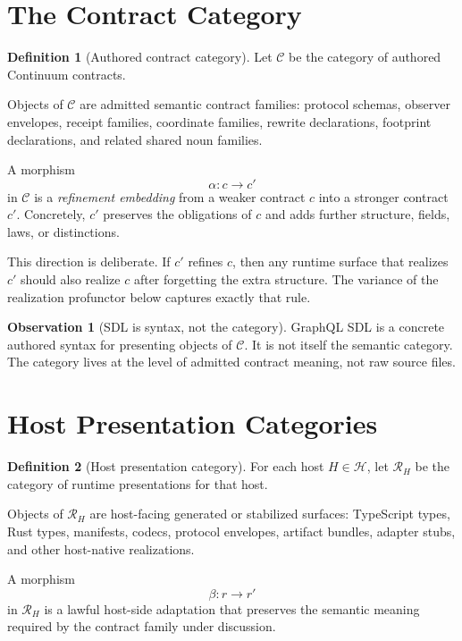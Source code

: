 \documentclass[11pt]{article}
\newcommand{\Ctr}{\mathcal{C}}
\newcommand{\Host}{\mathcal{H}}
\newcommand{\RHost}[1]{\mathcal{R}_{#1}}
\theoremstyle{definition}
\newtheorem{definition}{Definition}
\newtheorem{observation}{Observation}
\begin{document}
\section{The Contract Category}

\begin{definition}[Authored contract category]
Let $\Ctr$ be the category of authored Continuum contracts.

Objects of $\Ctr$ are admitted semantic contract families: protocol schemas,
observer envelopes, receipt families, coordinate families, rewrite
declarations, footprint declarations, and related shared noun families.

A morphism
\[
\alpha : c \to c'
\]
in $\Ctr$ is a \emph{refinement embedding} from a weaker contract $c$ into a
stronger contract $c'$. Concretely, $c'$ preserves the obligations of $c$ and
adds further structure, fields, laws, or distinctions.
\end{definition}

This direction is deliberate. If $c'$ refines $c$, then any runtime surface
that realizes $c'$ should also realize $c$ after forgetting the extra
structure. The variance of the realization profunctor below captures exactly
that rule.

\begin{observation}[SDL is syntax, not the category]
GraphQL SDL is a concrete authored syntax for presenting objects of $\Ctr$.
It is not itself the semantic category. The category lives at the level of
admitted contract meaning, not raw source files.
\end{observation}

\section{Host Presentation Categories}

\begin{definition}[Host presentation category]
For each host $H \in \Host$, let $\RHost{H}$ be the category of runtime
presentations for that host.

Objects of $\RHost{H}$ are host-facing generated or stabilized surfaces:
TypeScript types, Rust types, manifests, codecs, protocol envelopes,
artifact bundles, adapter stubs, and other host-native realizations.

A morphism
\[
\beta : r \to r'
\]
in $\RHost{H}$ is a lawful host-side adaptation that preserves the semantic
meaning required by the contract family under discussion.
\end{definition}
\end{document}

